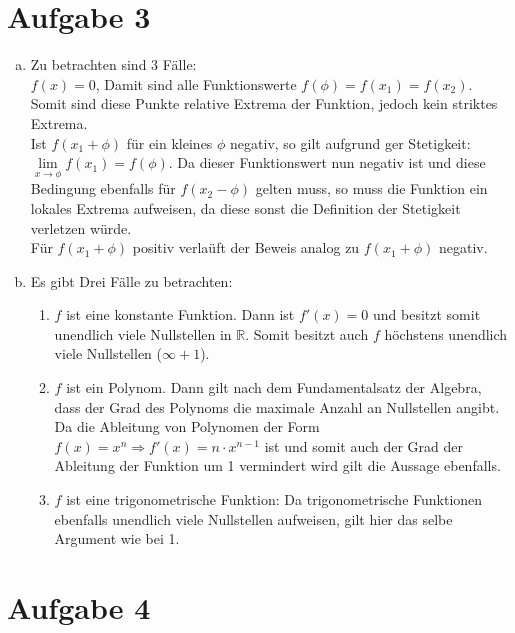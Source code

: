\documentclass[11pt,a4paper]{article}
\begin{document}
  \section*{Aufgabe 3}

  \begin{enumerate}[a)]
    \item Zu betrachten sind 3 Fälle:\\
          $f(x)=0$, Damit sind alle Funktionswerte $f(\phi) = f(x_1) = f(x_2)$. Somit sind diese Punkte relative Extrema der Funktion, jedoch kein striktes Extrema.\\
          Ist $f(x_1 + \phi)$ für ein kleines $\phi$ negativ, so gilt aufgrund ger Stetigkeit: $\lim\limits_{x \to \phi} f(x_1)=f(\phi)$. Da dieser Funktionswert nun negativ ist und diese Bedingung ebenfalls für $f(x_2 - \phi)$ gelten muss, so muss die Funktion ein lokales Extrema aufweisen, da diese sonst die Definition der Stetigkeit verletzen würde.\\
          Für $f(x_1+\phi)$ positiv verlaüft der Beweis analog zu $f(x_1+\phi)$ negativ.

    \item Es gibt Drei Fälle zu betrachten:
          \begin{enumerate}[1.]
            \item $f$ ist eine konstante Funktion. Dann ist $f'(x)=0$ und besitzt somit unendlich viele Nullstellen in $\mathbb{R}$. Somit besitzt auch $f$ höchstens unendlich viele Nullstellen ($\infty + 1$).

            \item $f$ ist ein Polynom. Dann gilt nach dem Fundamentalsatz der Algebra, dass der Grad des Polynoms die maximale Anzahl an Nullstellen angibt. Da die Ableitung von Polynomen der Form $f(x)=x^n\Rightarrow f'(x)=n\cdot x^{n-1}$ ist und somit auch der Grad der Ableitung der Funktion um 1 vermindert wird gilt die Aussage ebenfalls.

            \item $f$ ist eine trigonometrische Funktion: Da trigonometrische Funktionen ebenfalls unendlich viele Nullstellen aufweisen, gilt hier das selbe Argument wie bei 1.
          \end{enumerate}
  \end{enumerate}

  \section*{Aufgabe 4}
\end{document}
